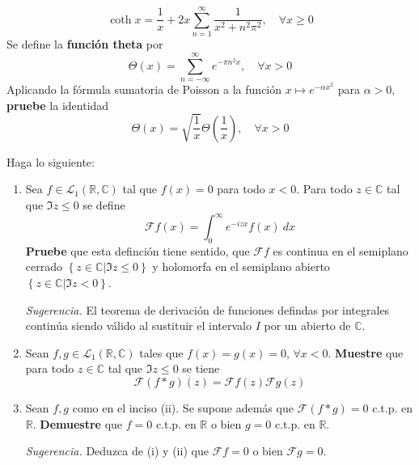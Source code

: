 \documentclass[12pt]{report}
\theoremstyle{largebreak}
\renewcommand{\leq}{\ensuremath{\leqslant}}
\renewcommand{\geq}{\ensuremath{\geqslant}}
\newcommand{\fou}[1]{\ensuremath{\mathcal{F}#1}}
\begin{document}
\begin{excer}
\begin{enumerate}
\begin{equation*}
                \coth x = \frac{1}{x}+2x\sum_{ n=1}^{\infty}\frac{1}{x^2+n^2\pi^2},\quad\forall x\geq0
            \end{equation*}
            Se define la \textbf{función theta} por
            \begin{equation*}
                \Theta(x)=\sum_{ n=-\infty}^{\infty}e^{ -\pi n^2x},\quad\forall x>0
            \end{equation*}
            Aplicando la fórmula sumatoria de Poisson a la función $x\mapsto e^{-\alpha x^2}$ para $\alpha>0$, \textbf{pruebe} la identidad
            \begin{equation*}
                \Theta(x)=\sqrt{\frac{1}{x}}\Theta\left(\frac{1}{x}\right),\quad\forall x>0
            \end{equation*}
        \end{enumerate}
    \end{excer}

    \begin{sol}
        
    \end{sol}

    \begin{excer}
        Haga lo siguiente:
        \begin{enumerate}
            \item Sea $f\in\mathcal{L}_1(\mathbb{R},\mathbb{C})$ tal que $f(x)=0$ para todo $x<0$. Para todo $z\in\mathbb{C}$ tal que $\Im z\leq 0$ se define
            \begin{equation*}
                \fou{f}(x)=\int_0^{\infty}e^{ -izx}f(x)\:dx
            \end{equation*}
            \textbf{Pruebe} que esta definción tiene sentido, que $\fou{f}$ es continua en el semiplano cerrado $\left\{z\in\mathbb{C}\Big|\Im z\leq0 \right\}$ y holomorfa en el semiplano abierto $\left\{z\in\mathbb{C}\Big|\Im z<0 \right\}$.

            \textit{Sugerencia.} El teorema de derivación de funciones defindas por integrales continúa siendo válido al sustituir el intervalo $I$ por un abierto de $\mathbb{C}$.

            \item Sean $f,g\in\mathcal{L}_1(\mathbb{R},\mathbb{C})$ tales que $f(x)=g(x)=0$, $\forall x<0$. \textbf{Muestre} que para todo $z\in\mathbb{C}$ tal que $\Im z\leq 0$ se tiene
            \begin{equation*}
                \fou{(f*g)}(z)=\fou{f}(z)\fou{g}(z)
            \end{equation*}
            \item Sean $f,g$ como en el inciso (ii). Se supone además que $\fou{(f*g)}=0$ c.t.p. en $\mathbb{R}$. \textbf{Demuestre} que $f=0$ c.t.p. en $\mathbb{R}$ o bien $g=0$ c.t.p. en $\mathbb{R}$.
            
            \textit{Sugerencia.} Deduzca de (i) y (ii) que $\fou{f}=0$ o bien $\fou{g}=0$.
        \end{enumerate}
    \end{excer}
\end{document}
